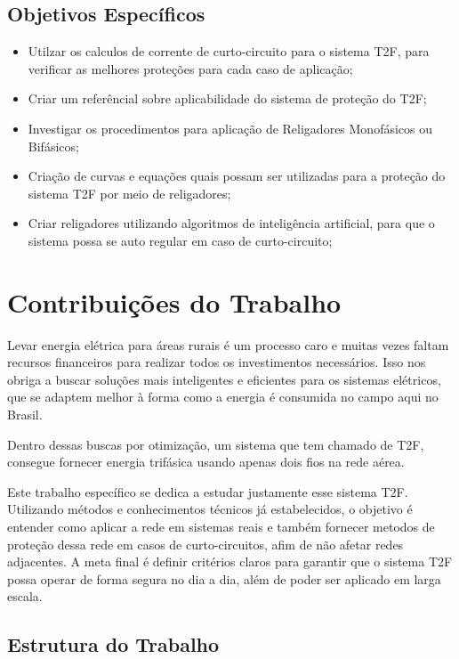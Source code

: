 \documentclass[oneside,openright,12pt]{ufsm_2021} %
\begin{document}
\subsection{Objetivos Específicos}
\begin{itemize}
	\item Utilzar os calculos de corrente de curto-circuito para o sistema T2F, para verificar as melhores proteções para cada caso de aplicação;
	\item Criar um referêncial sobre aplicabilidade do sistema de proteção do T2F;
	\item Investigar os procedimentos para aplicação de Religadores Monofásicos ou Bifásicos;
	\item Criação de curvas e equações quais possam ser utilizadas para a proteção do sistema T2F por meio de religadores;
	\item Criar religadores utilizando algoritmos de inteligência artificial, para que o sistema possa se auto regular em caso de curto-circuito;
\end{itemize}

\section{Contribuições do Trabalho}
\par Levar energia elétrica para áreas rurais é um processo caro e muitas vezes faltam recursos financeiros para realizar todos os investimentos necessários. Isso nos obriga a buscar soluções mais inteligentes e eficientes para os sistemas elétricos, que se adaptem melhor à forma como a energia é consumida no campo aqui no Brasil.

\par Dentro dessas buscas por otimização, um sistema que tem chamado de T2F, consegue fornecer energia trifásica usando apenas dois fios na rede aérea.

\par Este trabalho específico se dedica a estudar justamente esse sistema T2F. Utilizando métodos e conhecimentos técnicos já estabelecidos, o objetivo é entender como aplicar a rede em sistemas reais e também fornecer metodos de proteção dessa rede em casos de curto-circuitos, afim de não afetar redes adjacentes. A meta final é definir critérios claros para garantir que o sistema T2F possa operar de forma segura no dia a dia, além de poder ser aplicado em larga escala.

\subsection{Estrutura do Trabalho}
\end{document}
